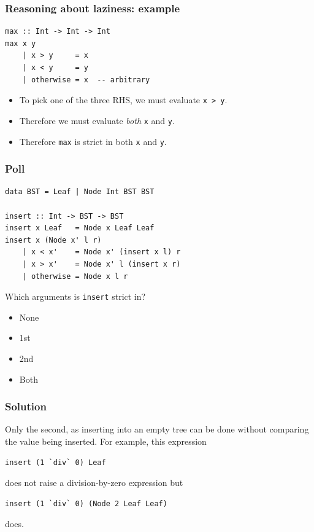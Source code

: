 \documentclass{beamer}
\begin{document}
\begin{frame}[fragile]
  \frametitle{Reasoning about laziness: example}

  \begin{lstlisting}
max :: Int -> Int -> Int
max x y
    | x > y     = x
    | x < y     = y
    | otherwise = x  -- arbitrary
  \end{lstlisting}

  \begin{itemize}
  \item To pick one of the three RHS, we must evaluate \lstinline!x > y!.
  \item Therefore we must evaluate \emph{both} \lstinline!x! and
    \lstinline!y!.
  \item Therefore \lstinline!max! is strict in both \lstinline!x! and
    \lstinline!y!.
  \end{itemize}
\end{frame}

\begin{frame}[fragile]
  \frametitle{Poll}

  \begin{lstlisting}
data BST = Leaf | Node Int BST BST

insert :: Int -> BST -> BST
insert x Leaf   = Node x Leaf Leaf
insert x (Node x' l r)
    | x < x'    = Node x' (insert x l) r
    | x > x'    = Node x' l (insert x r)
    | otherwise = Node x l r
  \end{lstlisting}

  Which arguments is \lstinline!insert! strict in?

  \begin{itemize}
  \item None
  \item 1st
  \item 2nd
  \item Both
  \end{itemize}
\end{frame}

\begin{frame}[fragile]
  \frametitle{Solution}

  Only the second, as inserting into an empty tree can be done without
  comparing the value being inserted.  For example, this expression
  \begin{lstlisting}
insert (1 `div` 0) Leaf
  \end{lstlisting}
does not raise a division-by-zero expression but
  \begin{lstlisting}
insert (1 `div` 0) (Node 2 Leaf Leaf)
  \end{lstlisting}
does.
\end{frame}
\end{document}
